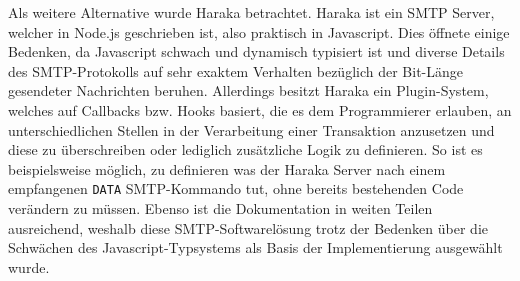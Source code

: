 Als weitere Alternative wurde Haraka betrachtet. Haraka ist ein SMTP Server, welcher in Node.js geschrieben ist, also praktisch in Javascript. Dies öffnete einige Bedenken, da Javascript schwach und dynamisch typisiert ist und diverse Details des SMTP-Protokolls auf sehr exaktem Verhalten bezüglich der Bit-Länge gesendeter Nachrichten beruhen. Allerdings besitzt Haraka ein Plugin-System, welches auf Callbacks bzw. Hooks basiert, die es dem Programmierer erlauben, an unterschiedlichen Stellen in der Verarbeitung einer Transaktion anzusetzen und diese zu überschreiben oder lediglich zusätzliche Logik zu definieren. So ist es beispielsweise möglich, zu definieren was der Haraka Server nach einem empfangenen \verb#DATA# SMTP-Kommando tut, ohne bereits bestehenden Code verändern zu müssen. Ebenso ist die Dokumentation in weiten Teilen ausreichend, weshalb diese SMTP-Softwarelösung trotz der Bedenken über die Schwächen des Javascript-Typsystems als Basis der Implementierung ausgewählt wurde.
